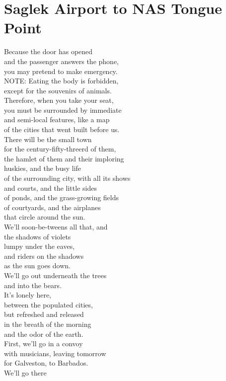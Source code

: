 \documentclass[smalldemyvopaper,11pt,twoside,onecolumn,openright,extrafontsizes]{memoir}
\begin{document}
\chapter{Saglek Airport to NAS Tongue Point}
Because the door has opened
\\and the passenger answers the phone,
\\you may pretend to make emergency.
\\NOTE: Eating the body is forbidden,
\\except for the souvenirs of animals.
\\Therefore, when you take your seat,
\\you must be surrounded by immediate
\\and semi-local features, like a map
\\of the cities that went built before us.
\\There will be the small town
\\for the century-fifty-threerd of them,
\\the hamlet of them and their imploring
\\huskies, and the busy life
\\of the surrounding city, with all its shows
\\and courts, and the little sides
\\of ponds, and the grass-growing fields
\\of courtyards, and the airplanes
\\that circle around the sun.
\\We'll soon-be-tweens all that, and
\\the shadows of violets
\\lumpy under the eaves,
\\and riders on the shadows
\\as the sun goes down.
\\We'll go out underneath the trees
\\and into the bears.
\\It's lonely here,
\\between the populated cities,
\\but refreshed and released
\\in the breath of the morning
\\and the odor of the earth.
\\First, we'll go in a convoy
\\with musicians, leaving tomorrow
\\for Galveston, to Barbados.
\\We'll go there
\end{document}
